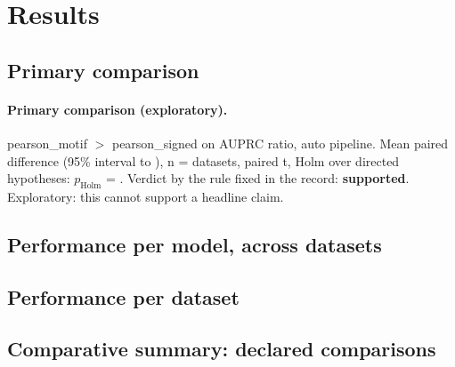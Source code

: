 \documentclass{article}
\begin{document}
\section{Results}
\subsection{Primary comparison}
\paragraph{Primary comparison (exploratory).} pearson\_motif $>$ pearson\_signed on AUPRC ratio, auto pipeline. Mean paired difference \gbDiffAuprcRatioAutoPearsonMotifVsPearsonSigned{} (95\% interval \gbCiLowAuprcRatioAutoPearsonMotifVsPearsonSigned{} to \gbCiHighAuprcRatioAutoPearsonMotifVsPearsonSigned{}), n = \gbNAuprcRatioAutoPearsonMotifVsPearsonSigned{} datasets, paired t, Holm over \gbFamilyAuprcRatioAuto{} directed hypotheses: $p_{\mathrm{Holm}}$ = \gbPHolmAuprcRatioAutoPearsonMotifVsPearsonSigned{}. Verdict by the rule fixed in the record: \textbf{supported}. Exploratory: this cannot support a headline claim.

\subsection{Performance per model, across datasets}

\subsection{Performance per dataset}

\subsection{Comparative summary: declared comparisons}




\end{document}
